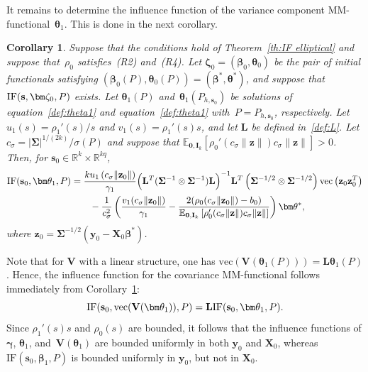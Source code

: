 \documentclass{article}
\numberwithin{equation}{section}
\theoremstyle{plain}
\newtheorem{corollary}{Corollary}
\newcommand{\R}{\mathbb{R}}
\newcommand{\vc}{\mathrm{vec}}
\newcommand{\bbeta}{\bm\beta}
\newcommand{\btheta}{\bm\theta}
\newcommand{\bgamma}{\bm\gamma}
\newcommand{\bSigma}{\mathbf{\Sigma}}
\newcommand{\bzeta}{\bm\zeta}
\newcommand{\by}{\mathbf{y}}
\newcommand{\bs}{\mathbf{s}}
\newcommand{\bz}{\mathbf{z}}
\newcommand{\bX}{\mathbf{X}}
\newcommand{\bV}{\mathbf{V}}
\newcommand{\bI}{\mathbf{I}}
\newcommand{\bL}{\mathbf{L}}
\newcommand{\E}{\mathbb{E}}
\begin{document}
It remains to determine the influence function of the variance component MM-functional~$\btheta_1$.
This is done in the next corollary.
\begin{corollary}
\label{cor:IF theta1}
Suppose that the conditions hold of Theorem~\ref{th:IF elliptical}
and suppose that~$\rho_0$ satisfies~(R2) and~(R4).
Let $\bzeta_0=(\bbeta_0,\btheta_0)$ be the pair of initial functionals
satisfying $(\bbeta_0(P),\btheta_0(P))=(\bbeta^*,\btheta^*)$,
and suppose that $\text{\rm IF}(\bs,\bzeta_0,P)$ exists.
Let $\btheta_1(P)$ and~$\btheta_1(P_{h,\bs_0})$ be solutions of equation~\eqref{def:theta1}
and equation~\eqref{def:theta1} with~$P=P_{h,\bs_0}$, respectively.
Let $u_1(s)=\rho_1'(s)/s$ and $v_1(s)=\rho_1'(s)s$,
and let $\bL$ be defined in~\eqref{def:L}.
Let $c_\sigma=|\bSigma|^{1/(2k)}/\sigma(P)$ and suppose that 
$\E_{\mathbf{0},\bI_k}[
\rho_0'
\left(
c_\sigma\|\bz\|
\right)
c_\sigma\|\bz\|]
>0$.
Then, for $\bs_0\in\R^k\times\R^{kq}$,
\[
\begin{split}
\text{\rm IF}(\bs_0,\btheta_1,P)
&=
\frac{ku_1\left(c_\sigma\|\bz_0\|\right)}{\gamma_1}
\Big(\bL^T(\bSigma^{-1}\otimes\bSigma^{-1})\bL\Big)^{-1}
\bL^T\left(\bSigma^{-1/2}\otimes\bSigma^{-1/2}\right)
\vc\left(\bz_0\bz_0^T\right)\\
&\qquad-
\frac{1}{c_\sigma^2}
\left(
\frac{v_1(c_\sigma\|\bz_0\|)}{\gamma_1}
-
\frac{2(\rho_0(c_\sigma\|\bz_0\|)-b_0)}{\E_{\mathbf{0},\bI_k}
\left[
\rho_0'(c_\sigma\|\bz\|)c_\sigma\|\bz\|
\right]}
\right)
\btheta^*,
\end{split}
\]
where $\bz_0=\bSigma^{-1/2}(\by_0-\bX_0\bbeta^*)$.
\end{corollary}
Note that for $\bV$ with a linear structure, one has $\vc(\bV(\btheta_1(P)))=\bL\btheta_1(P)$.
Hence, the influence function for the covariance MM-functional follows immediately from Corollary~\ref{cor:IF theta1}:
\begin{equation}
\label{eq:IF Vtheta1}
\text{\rm IF}(\bs_0,\vc(\bV(\btheta_1)),P)
=
\bL
\text{\rm IF}(\bs_0,\btheta_1,P).
\end{equation}
Since $\rho_1'(s)s$ and $\rho_0(s)$ are bounded,
it follows that the influence functions of $\bgamma$, $\btheta_1$, and~$\bV(\btheta_1)$
are bounded uniformly in both $\by_0$ and $\bX_0$,
whereas $\mathrm{IF}(\bs_0,\bbeta_1,P)$ is bounded uniformly in $\by_0$, but not in $\bX_0$.
\end{document}
